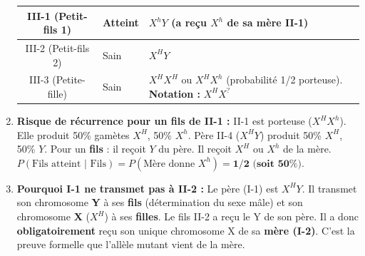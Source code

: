 \documentclass[11pt]{article}
\begin{document}
\begin{exoresolu}
\begin{enumerate}
\begin{center}
\begin{tabular}{|c|l|l|}
            III-1 (Petit-fils 1) & \textbf{Atteint} & $X^h Y$ (a reçu $X^h$ de sa mère II-1) \\ \hline
            III-2 (Petit-fils 2) & Sain & $X^H Y$ \\ \hline
            III-3 (Petite-fille) & Sain & $X^H X^H$ ou $X^H X^h$ (probabilité 1/2 porteuse). \textbf{Notation :} $X^H X^{?}$ \\ \hline
            \end{tabular}
            \end{center}
        \item \textbf{Risque de récurrence pour un fils de II-1 :}
            II-1 est porteuse ($X^H X^h$). Elle produit 50\% gamètes $X^H$, 50\% $X^h$.
            Père II-4 ($X^H Y$) produit 50\% $X^H$, 50\% $Y$.
            Pour un \textbf{fils} : il reçoit $Y$ du père. Il reçoit $X^H$ ou $X^h$ de la mère.
            $P(\text{Fils atteint } | \text{ Fils}) = P(\text{Mère donne } X^h) = \mathbf{1/2 \text{ (soit 50\%)}}$.
        \item \textbf{Pourquoi I-1 ne transmet pas à II-2 :}
            Le père (I-1) est $X^H Y$. Il transmet son chromosome \textbf{Y} à ses \textbf{fils} (détermination du sexe mâle) et son chromosome \textbf{X} ($X^H$) à ses \textbf{filles}.
            Le fils II-2 a reçu le Y de son père. Il a donc \textbf{obligatoirement} reçu son unique chromosome X de sa \textbf{mère (I-2)}. C'est la preuve formelle que l'allèle mutant vient de la mère.
    \end{enumerate}
    \begin{popfigure}
\end{popfigure}
\end{exoresolu}
\end{document}
